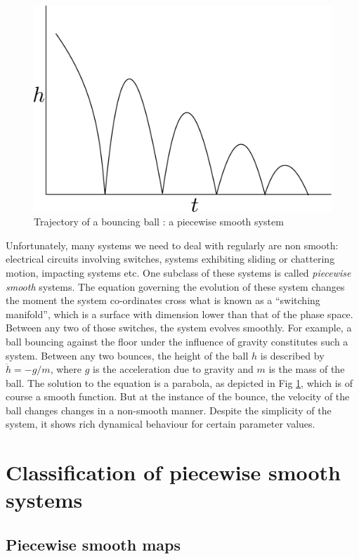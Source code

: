 \documentclass{book}
\renewcommand{\(}{\begin{columns}}
\renewcommand{\)}{\end{columns}}
\newcommand{\<}[1]{\begin{column}{#1}}
\renewcommand{\>}{\end{column}}
\begin{document}
\begin{figure}
\label{fig-bouncing_ball}
\caption{Trajectory of a bouncing ball : a piecewise smooth system}
\begin{center}
\includegraphics[width=0.4\columnwidth]{bounce}
\end{center}
\end{figure}

Unfortunately, many systems we need to deal with regularly are non smooth: 
electrical circuits involving switches, systems exhibiting sliding or 
chattering motion, impacting systems etc.  One subclass of these systems is 
called  \emph{piecewise smooth} systems. The equation governing the evolution 
of these system changes the moment  the system 
co-ordinates cross what is known as a ``switching manifold'', which is a 
surface with 
dimension lower than that of the phase space.  Between any two of those 
switches, the system evolves smoothly. For example, a ball bouncing against 
the floor under the influence of gravity constitutes such a system.  Between 
any two bounces, the height of the ball $h$ is described by $\ddot{h}=-g/m$, 
where $g$ is the acceleration due to gravity and $m$ is the mass of the ball.  
The solution to the equation is a parabola, as depicted in Fig 
\ref{fig-bouncing_ball}, which is of course a smooth function.  But at the 
instance of the bounce, the velocity of the ball changes changes in a 
non-smooth manner.  Despite the simplicity of the system, it shows rich 
dynamical behaviour for certain parameter values\cite{2010arXiv1002.2448O}.  


\section{Classification of piecewise smooth systems}
\subsection{Piecewise smooth maps}
\end{document}
